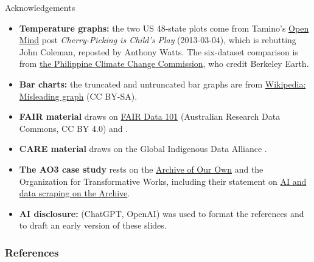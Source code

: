 \documentclass[aspectratio=169]{beamer}
\begin{document}
\begin{frame}[allowframebreaks]{Acknowledgements}
  \small
  \begin{itemize}
  \item \textbf{Temperature graphs:} the two US 48-state plots come from
    Tamino's \href{https://tamino.wordpress.com/2013/03/04/cherry-picking-is-childs-play/}{Open Mind}
    post \textit{Cherry-Picking is Child's Play} (2013-03-04), which is
    rebutting John Coleman, reposted by Anthony Watts.  The six-dataset
    comparison is from
    \href{https://www.climate.gov.ph/news/416}{the Philippine Climate Change Commission},
    who credit Berkeley Earth.
  \item \textbf{Bar charts:} the truncated and untruncated bar graphs are from
    \href{https://en.wikipedia.org/wiki/Misleading_graph}{Wikipedia: Misleading graph} (CC BY-SA).
  \item \textbf{FAIR material} draws on
    \href{https://au-research.github.io/FAIR-data-101-training/}{FAIR Data 101}
    (Australian Research Data Commons, CC BY 4.0) and \citet{FAIR2016}.
  \item \textbf{CARE material} draws on the Global Indigenous Data Alliance
    \citep{CARE2020}.
  \item \textbf{The AO3 case study} rests on the
    \href{https://archiveofourown.org/}{Archive of Our Own} and the
    Organization for Transformative Works, including their statement on
    \href{https://www.transformativeworks.org/ai-and-data-scraping-on-the-archive/}{AI and data scraping on the Archive}.
  \item \textbf{AI disclosure:} \textcite{openai-chatgpt-2025-03-14} (ChatGPT,
    OpenAI) was used to format the references and to draft an early version of
    these slides.
  \aicheck
  \end{itemize}
\end{frame}


\begin{frame}[allowframebreaks]
\frametitle{References}
\printbibliography[heading=none]
\end{frame}
\end{document}
